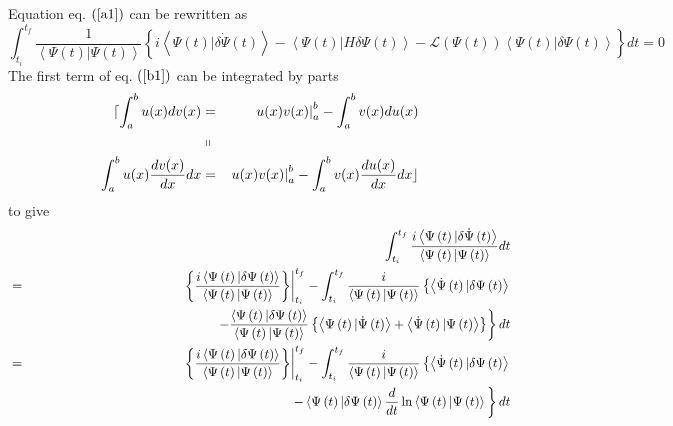 \documentclass[aps,preprint]{revtex4}
\begin{document}
Equation eq. $\left( \ref{a1}\right) $ can be rewritten as 
\begin{equation}
\int_{t_{i}}^{t_{f}}\frac{1}{\left\langle \Psi \left( t\right) |\Psi \left(
t\right) \right\rangle }\left\{ i\left\langle \Psi \left( t\right) |\delta 
\dot{\Psi}\left( t\right) \right\rangle -\left\langle \Psi \left( t\right)
|H\delta \Psi \left( t\right) \right\rangle -\mathcal{L}\left( \Psi \left(
t\right) \right) \left\langle \Psi \left( t\right) |\delta \Psi \left(
t\right) \right\rangle \right\} dt=0  \label{b1}
\end{equation}%
The first term of eq. $\left( \ref{b1}\right) $ can be integrated by parts 
\begin{eqnarray}
\lceil \int_{a}^{b}u(x)dv(x) &=&\left. u(x)v(x)\right\vert
_{a}^{b}-\int_{a}^{b}v(x)du(x)  \notag \\
&\shortparallel &  \notag \\
\int_{a}^{b}u(x)\frac{dv(x)}{dx}dx &=&\left. u(x)v(x)\right\vert
_{a}^{b}-\int_{a}^{b}v(x)\frac{du(x)}{dx}dx\rfloor
\end{eqnarray}%
to give 
\begin{eqnarray}
&&\int_{t_{i}}^{t_{f}}\frac{i\left\langle \Psi \left( t\right) |\delta \dot{%
\Psi}\left( t\right) \right\rangle }{\left\langle \Psi \left( t\right) |\Psi
\left( t\right) \right\rangle }dt  \notag \\
&=&\left. \left\{ \frac{i\left\langle \Psi \left( t\right) |\delta \Psi
\left( t\right) \right\rangle }{\left\langle \Psi \left( t\right) |\Psi
\left( t\right) \right\rangle }\right\} \right\vert
_{t_{i}}^{t_{f}}-\int_{t_{i}}^{t_{f}}\frac{i}{\left\langle \Psi \left(
t\right) |\Psi \left( t\right) \right\rangle }\left\{ \left\langle \dot{\Psi}%
\left( t\right) |\delta \Psi \left( t\right) \right\rangle \right.  \notag \\
&&\qquad \qquad \qquad \qquad \qquad \qquad \qquad \left. -\frac{%
\left\langle \Psi \left( t\right) |\delta \Psi \left( t\right) \right\rangle 
}{\left\langle \Psi \left( t\right) |\Psi \left( t\right) \right\rangle }%
\left\{ \left\langle \Psi \left( t\right) |\dot{\Psi}\left( t\right)
\right\rangle +\left\langle \dot{\Psi}\left( t\right) |\Psi \left( t\right)
\right\rangle \right\} \right\} dt  \notag \\
&=&\left. \left\{ \frac{i\left\langle \Psi \left( t\right) |\delta \Psi
\left( t\right) \right\rangle }{\left\langle \Psi \left( t\right) |\Psi
\left( t\right) \right\rangle }\right\} \right\vert
_{t_{i}}^{t_{f}}-\int_{t_{i}}^{t_{f}}\frac{i}{\left\langle \Psi \left(
t\right) |\Psi \left( t\right) \right\rangle }\left\{ \left\langle \dot{\Psi}%
\left( t\right) |\delta \Psi \left( t\right) \right\rangle \right.  \notag \\
&&\qquad \qquad \qquad \qquad \qquad \qquad \qquad \qquad \qquad \left.
-\left\langle \Psi \left( t\right) |\delta \Psi \left( t\right)
\right\rangle \frac{d}{dt}\ln \left\langle \Psi \left( t\right) |\Psi \left(
t\right) \right\rangle \overset{}{}\right\} dt
\end{eqnarray}%
\end{document}
